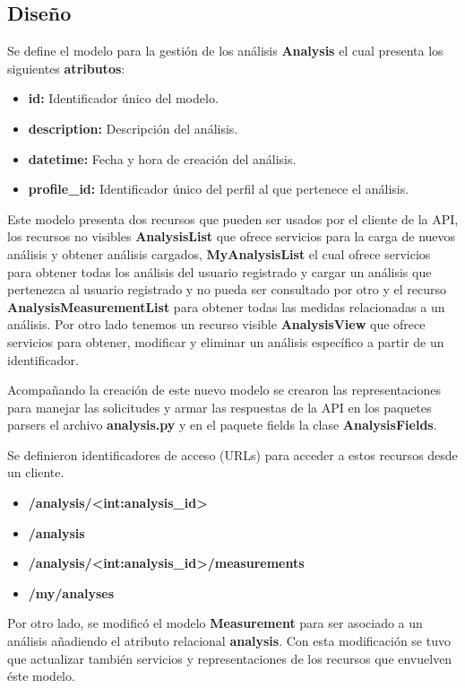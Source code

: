 \subsection{Diseño}

	Se define el modelo para la gestión de los análisis \textbf{Analysis} el cual presenta los siguientes \textbf{atributos}:

\begin{itemize}
	\item \textbf{id:} Identificador único del modelo.
	\item \textbf{description:} Descripción del análisis.
	\item \textbf{datetime: }	Fecha y hora de creación del análisis.	
	\item \textbf{profile\_id: } Identificador único del perfil al que pertenece el análisis.
\end{itemize}

	Este modelo presenta dos recursos que pueden ser usados por el cliente de la API, los recursos no visibles \textbf{AnalysisList} que ofrece servicios para la carga de nuevos análisis y obtener análisis cargados, \textbf{MyAnalysisList} el cual ofrece servicios para obtener todas los análisis del usuario registrado y cargar un análisis que pertenezca al usuario registrado y no pueda ser consultado por otro y el recurso \textbf{AnalysisMeasurementList} para obtener todas las medidas relacionadas a un análisis. Por otro lado tenemos un recurso visible \textbf{AnalysisView} que ofrece servicios para obtener, modificar y eliminar un análisis específico a partir de un identificador.
	
	
	Acompañando la creación de este nuevo modelo se crearon las representaciones para manejar las solicitudes y armar las respuestas de la API en los paquetes parsers el archivo \textbf{analysis.py} y en el paquete fields la clase \textbf{AnalysisFields}.
	
	Se definieron identificadores de acceso (URLs) para acceder a estos recursos desde un cliente.
		\begin{itemize}
			\item \textbf{/analysis/<int:analysis\_id>}
			\item \textbf{/analysis}
			\item \textbf{/analysis/<int:analysis\_id>/measurements}
			\item \textbf{/my/analyses}
		\end{itemize} 
		
	Por otro lado, se modificó el modelo \textbf{Measurement} para ser asociado a un análisis añadiendo el atributo relacional \textbf{analysis}. Con esta modificación se tuvo que actualizar también servicios y representaciones de los recursos que envuelven éste modelo.
	
